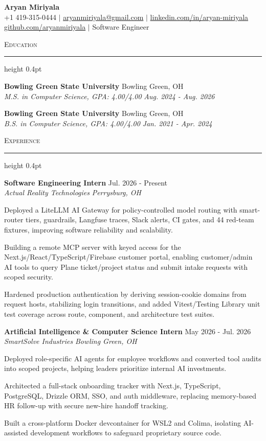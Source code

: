 \documentclass[letterpaper,11pt]{article}
\newcommand{\resumesection}[1]{%
  \par\vspace{2pt}%
  {\large\scshape #1}\par\vspace{2pt}%
  \hrule height 0.4pt\vspace{2pt}%
}
\newcommand{\resumeSubheading}[4]{
  \textbf{#1} \hfill #2\\
  \textit{#3} \hfill \textit{#4}
}
\begin{document}
\begin{center}
  {\LARGE \textbf{Aryan Miriyala}}\\[2pt]
  \small
  +1 419-315-0444 $|$ \href{mailto:aryanmiriyala@gmail.com}{aryanmiriyala@gmail.com} $|$ \href{https://www.linkedin.com/in/aryan-miriyala-7788a21b6/}{linkedin.com/in/aryan-miriyala}\\
  \href{https://github.com/aryanmiriyala}{github.com/aryanmiriyala} $|$ Software Engineer
\end{center}\vspace{-6pt}

\resumesection{Education}
\resumeSubheading
{Bowling Green State University}{Bowling Green, OH}
{M.S. in Computer Science, GPA: 4.00/4.00}{Aug. 2024 - Aug. 2026}

\resumeSubheading
{Bowling Green State University}{Bowling Green, OH}
{B.S. in Computer Science, GPA: 4.00/4.00}{Jan. 2021 - Apr. 2024}

\resumesection{Experience}
\resumeSubheading
{Software Engineering Intern}{Jul. 2026 - Present}
{Actual Reality Technologies}{Perrysburg, OH}
\begin{tightitemize}
  \item Deployed a LiteLLM AI Gateway for policy-controlled model routing with smart-router tiers, guardrails, Langfuse traces, Slack alerts, CI gates, and 44 red-team fixtures, improving software reliability and scalability.
  \item Building a remote MCP server with keyed access for the Next.js/React/TypeScript/Firebase customer portal, enabling customer/admin AI tools to query Plane ticket/project status and submit intake requests with scoped security.
  \item Hardened production authentication by deriving session-cookie domains from request hosts, stabilizing login transitions, and added Vitest/Testing Library unit test coverage across route, component, and architecture test suites.
\end{tightitemize}

\resumeSubheading
{Artificial Intelligence \& Computer Science Intern}{May 2026 - Jul. 2026}
{SmartSolve Industries}{Bowling Green, OH}
\begin{tightitemize}
  \item Deployed role-specific AI agents for employee workflows and converted tool audits into scoped projects, helping leaders prioritize internal AI investments.
  \item Architected a full-stack onboarding tracker with Next.js, TypeScript, PostgreSQL, Drizzle ORM, SSO, and auth middleware, replacing memory-based HR follow-up with secure new-hire handoff tracking.
  \item Built a cross-platform Docker devcontainer for WSL2 and Colima, isolating AI-assisted development workflows to safeguard proprietary source code.
\end{tightitemize}
\end{document}
